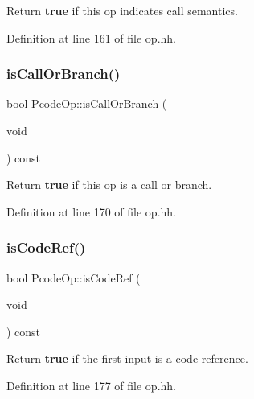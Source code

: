 Return {\bfseries{true}} if this op indicates call semantics. 



Definition at line 161 of file op.\+hh.

\mbox{\label{class_pcode_op_a1c630b06db046c161adda94895ac78d8}} 
\subsubsection{\texorpdfstring{isCallOrBranch()}{isCallOrBranch()}}
{\footnotesize\ttfamily bool Pcode\+Op\+::is\+Call\+Or\+Branch (\begin{DoxyParamCaption}\item[{void}]{ }\end{DoxyParamCaption}) const\hspace{0.3cm}{\ttfamily [inline]}}



Return {\bfseries{true}} if this op is a call or branch. 



Definition at line 170 of file op.\+hh.

\mbox{\label{class_pcode_op_a44e7e2be61889bbee3efe0ef5d0d0ca3}} 
\subsubsection{\texorpdfstring{isCodeRef()}{isCodeRef()}}
{\footnotesize\ttfamily bool Pcode\+Op\+::is\+Code\+Ref (\begin{DoxyParamCaption}\item[{void}]{ }\end{DoxyParamCaption}) const\hspace{0.3cm}{\ttfamily [inline]}}



Return {\bfseries{true}} if the first input is a code reference. 



Definition at line 177 of file op.\+hh.

\mbox{\label{class_pcode_op_abd972b908036802cebc2c3fa5256a9f9}} 
